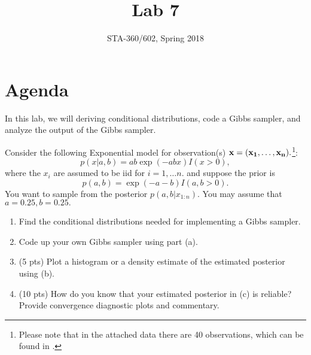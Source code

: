 \documentclass{article}
\begin{document}
\title{Lab 7}
\author{STA-360/602, Spring 2018}
\maketitle

\section{Agenda}

In this lab, we will deriving conditional distributions, code a Gibbs sampler, and analyze the output of the Gibbs sampler. 

Consider the following Exponential model for observation(s) $\bf{x}=(x_1,\ldots,x_n).$\footnote{Please note that in the attached data there are 40 observations, which can be found in .}:
$$ p(x|a,b) = a b \exp(- a b x) I(x>0),$$ where the $x_i$ are assumed to be iid for $i=1,\ldots n.$
and suppose the prior is 
$$ p(a,b) = \exp(- a - b)I(a,b>0). $$
You want to sample from the posterior $p(a,b|x_{1:n})$.  You may assume that $a=0.25, b=0.25.$

\begin{enumerate}
\item Find the conditional distributions needed for implementing a Gibbs sampler.
\item Code up your own Gibbs sampler using part (a).
\item (5 pts) Plot a histogram or a density estimate of the estimated posterior using (b). 
\item (10 pts) How do you know that your estimated posterior in (c) is reliable? Provide convergence diagnostic plots and commentary. 
\end{enumerate}
\end{document}
